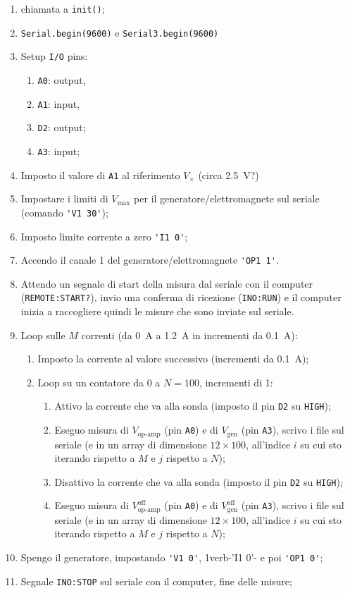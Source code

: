 \documentclass[fleqn,varvw,preprintnumbers,citeautoscript]{memo}
\begin{document}
\begin{enumerate}
    \item chiamata a \verb-init()-;
    \item \verb-Serial.begin(9600)- e \verb-Serial3.begin(9600)-
    \item Setup \verb-I/O- pins: 
    \begin{enumerate}
        \item \verb-A0-: output,
        \item \verb-A1-: input,
        \item \verb-D2-: output;
        \item \verb-A3-: input;
    \end{enumerate}
    \item Imposto il valore di \verb-A1- al riferimento $V_\times$ (circa \SI{2.5}{\volt}?)
    \item Impostare i limiti di $V_\text{max}$ per il generatore/elettromagnete sul seriale (comando \verb-'V1 30'-);
    \item Imposto limite corrente a zero \verb-'I1 0'-;
    \item Accendo il canale 1 del generatore/elettromagnete \verb-'OP1 1'-.
    \item Attendo un segnale di start della misura dal seriale con il computer (\verb+REMOTE:START?+), invio una conferma di ricezione (\verb+INO:RUN+) e il computer inizia a raccogliere quindi le misure che sono inviate sul seriale.
    \item Loop sulle $M$ correnti (da \SI{0}{\ampere} a \SI{1.2}{\ampere} in incrementi da \SI{0.1}{\ampere}): \begin{enumerate}
        \item Imposto la corrente al valore successivo (incrementi da \SI{0.1}{\ampere});
        \item Loop su un contatore da 0 a $N=100$, incrementi di 1: \begin{enumerate}
            \item Attivo la corrente che va alla sonda (imposto il pin \verb-D2- su \verb-HIGH-);
            \item Eseguo misura di $V_\text{op-amp}$ (pin \verb-A0-) e di $V_\text{gen}$ (pin \verb-A3-), scrivo i file sul seriale (e in un array di dimensione $12\times100$, all'indice $i$ su cui sto iterando rispetto a $M$ e $j$ rispetto a $N$);
            \item Disattivo la corrente che va alla sonda (imposto il pin \verb-D2- su \verb-HIGH-);
            \item Eseguo misura di $V_\text{op-amp}^\text{off}$ (pin \verb-A0-) e di $V_\text{gen}^\text{off}$ (pin \verb-A3-), scrivo i file sul seriale (e in un array di dimensione $12\times100$, all'indice $i$ su cui sto iterando rispetto a $M$ e $j$ rispetto a $N$);
        \end{enumerate}
    \end{enumerate}
    \item Spengo il generatore, impostando \verb-'V1 0'-, 1verb-'I1 0'- e poi \verb-'OP1 0'-;
    \item Segnale \verb-INO:STOP- sul seriale con il computer, fine delle misure;
\end{enumerate}
\end{document}
